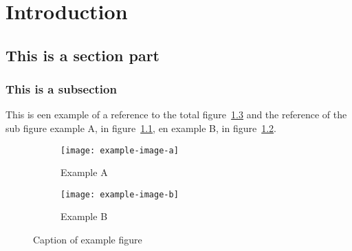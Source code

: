 \documentclass[11pt]{report}
\begin{document}
    \chapter{Introduction}
    \section{This is a section part}
    \subsection{This is a subsection}

    This is een example of a reference to the total figure~\ref{fig:caption_of_example_figure} and the reference of
    the sub figure example A, in figure~\ref{fig:example_a}, en example B, in figure~\ref{fig:example_b}.

    \begin{figure}[t!]%
        \begin{subfigure}[t]{0.5\linewidth}%
            \texttt{[image: example-image-a]}
            \caption{\footnotesize{Example A}}%
            \label{fig:example_a}%
        \end{subfigure}%

        \begin{subfigure}[t]{0.5\linewidth}%
            \texttt{[image: example-image-b]}
            \caption{\footnotesize{Example B}}%
            \label{fig:example_b}%
        \end{subfigure}%
        \caption{Caption of example figure}
        \label{fig:caption_of_example_figure}%
    \end{figure}
\end{document}
